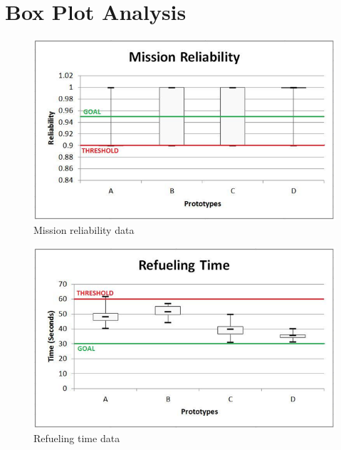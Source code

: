 \documentclass[letterpaper,10pt]{article}
\begin{document}
\section{Box Plot Analysis}
\label{sec:boxPlot}
\begin{figure}[h!tbp]
	\begin{center}
		\includegraphics[scale=0.65]{images/missionReliability.png}
	\end{center}
	\caption{Mission reliability data}
	\label{fig:missionReliability}
\end{figure}

\begin{figure}[h!tbp]
	\begin{center}
		\includegraphics[scale=0.65]{images/refuelingTime.png}
	\end{center}
	\caption{Refueling time data}
	\label{fig:refuelingTime}
\end{figure}
\end{document}

